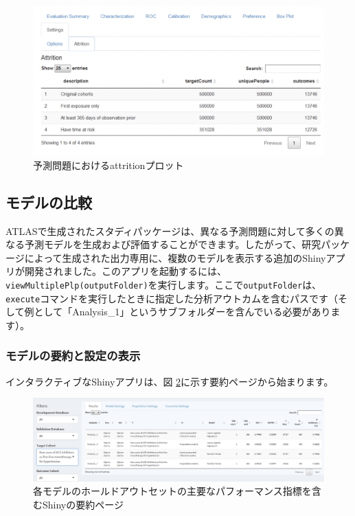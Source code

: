 \documentclass[
  11pt]{book}
\theoremstyle{definition}
\theoremstyle{definition}
\theoremstyle{definition}
\theoremstyle{definition}
\theoremstyle{remark}
\begin{document}
\begin{figure}

{\centering \includegraphics[width=1\linewidth]{images/PatientLevelPrediction/shiny/singleShiny/singleShinyAtt} 

}

\caption{予測問題におけるattritionプロット}\label{fig:shinyAtt}
\end{figure}

\subsection{モデルの比較}\label{ux30e2ux30c7ux30ebux306eux6bd4ux8f03}

ATLASで生成されたスタディパッケージは、異なる予測問題に対して多くの異なる予測モデルを生成および評価することができます。したがって、研究パッケージによって生成された出力専用に、複数のモデルを表示する追加のShinyアプリが開発されました。このアプリを起動するには、\texttt{viewMultiplePlp(outputFolder)}を実行します。ここで\texttt{outputFolder}は、\texttt{execute}コマンドを実行したときに指定した分析アウトカムを含むパスです（そして例として「Analysis\_1」というサブフォルダーを含んでいる必要があります）。

\subsubsection*{モデルの要約と設定の表示}\label{ux30e2ux30c7ux30ebux306eux8981ux7d04ux3068ux8a2dux5b9aux306eux8868ux793a}

インタラクティブなShinyアプリは、図 \ref{fig:multiShinySummary}に示す要約ページから始まります。

\begin{figure}

{\centering \includegraphics[width=1\linewidth]{images/PatientLevelPrediction/shiny/shinyFilter} 

}

\caption{各モデルのホールドアウトセットの主要なパフォーマンス指標を含むShinyの要約ページ}\label{fig:multiShinySummary}
\end{figure}
\end{document}
